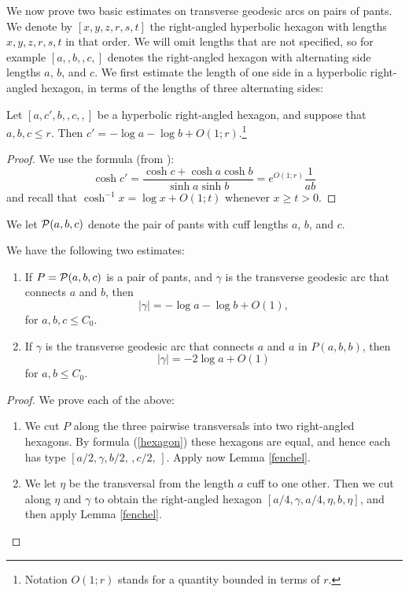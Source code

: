 We now prove two basic estimates on transverse geodesic arcs on pairs of pants.
We denote by
$[x, y, z, r, s, t]$
the right-angled hyperbolic hexagon
with lengths $x, y, z, r, s, t$ in that order.
We will omit lengths that are not specified,
so for example $[a,,b,,c,]$
denotes the right-angled hexagon with alternating side lengths $a$, $b$, and $c$.
We first estimate the length of one side in a hyperbolic right-angled hexagon,
in terms of the lengths of three alternating sides:
\begin{lem}\label{fenchel}
Let $[a, c', b, , c, ,]$ be a hyperbolic right-angled hexagon,
and suppose that $a, b, c \le r$.
Then $c' = -\log a - \log b + O(1;r)$.\footnote{Notation $O(1;r)$ stands for a quantity  bounded
     in terms of  $r$. }
\end{lem}
\begin{proof}
We use the formula (from \cite{Fenchel:Elementary}):
\begin{equation}\label{hexagon}
\cosh c' = \frac{\cosh c + \cosh a \cosh b}{\sinh a \sinh b}
         = e^{O(1; r)} \frac 1 {ab}
\end{equation}
and recall that $\cosh^{-1} x = \log x + O(1; t)$
whenever $x \ge t > 0$.
\end{proof}
We let ${\mathcal P}(a, b, c)$ denote the pair of pants with cuff lengths $a$, $b$, and $c$.
\begin{lemma}
We have the following two estimates:
\begin{enumerate}
\item
If $P = {\mathcal P}(a, b, c)$ is a pair of pants,
and $\gamma$ is the transverse geodesic arc that connects $a$ and $b$,
then
$$
|\gamma| = -\log a - \log b + O(1),
$$
for $a, b, c \le C_0$.
\item
If $\gamma$ is the transverse geodesic arc that connects $a$ and $a$ in $P(a, b, b)$,
then
$$
|\gamma| = - 2 \log a + O(1)
$$
for $a, b \le C_0$.
\end{enumerate}
\end{lemma}
\begin{proof}
We prove each of the above:
\begin{enumerate}
\item
We cut $P$ along the three pairwise transversals
into two right-angled hexagons.
By formula (\ref{hexagon}) these hexagons are equal,
and hence each has type
$[a/2, \gamma,b/2, \, , c/2, \,]$.
Apply now Lemma \ref{fenchel}.

\item
We let $\eta$ be the transversal from the length $a$ cuff to one other.
Then we cut along $\eta$ and $\gamma$ to obtain the right-angled hexagon
$[a/4, \gamma, a/4, \eta, b, \eta]$,
and then apply Lemma \ref{fenchel}. \qedhere
\end{enumerate}
\end{proof}

